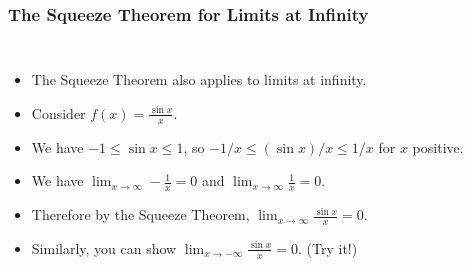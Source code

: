\documentclass[serif,ignorenonframetext]{beamer}
\newcommand{\ds}{\displaystyle}
\begin{document}
\begin{frame}
  \frametitle{The Squeeze Theorem for Limits at Infinity}
  \begin{columns}
  \begin{itemize}[<+->]
  \item The Squeeze Theorem also applies to limits at infinity.
  \item Consider $\ds f(x)=\frac{\sin x}{x}$.
  \item We have $\ds -1\le \sin x\le 1$, so 
    $\ds -1/x \le (\sin x)/x \le 1/x$ for $x$ positive.
  \item We have $\ds \lim_{x\to\infty} -\frac{1}{x} = 0$ and
    $\ds \lim_{x\to\infty} \frac{1}{x} = 0$.
  \item Therefore by the Squeeze Theorem, $\ds\lim_{x\to\infty} \frac{\sin x}{x}    = 0$.
  \item Similarly, you can show $\ds \lim_{x\to -\infty} \frac{\sin x}{x} = 0$.
    (Try it!)
  \end{itemize}

\end{columns}
\end{frame}
\end{document}
